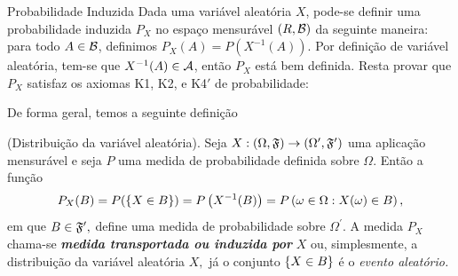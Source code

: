 \begin{frame}
%
\begin{block}{Probabilidade Induzida}
Dada uma variável aleatória $X$, pode-se definir uma probabilidade
induzida $P_X$ no espaço mensurável $(R,{\cal B})$ da seguinte maneira:
para todo $A\in {\cal B}$, definimos $P_X(A)=P(X^{-1}(A))$. Por definição
de variável aleatória, tem-se que $X^{-1}(A)\in {\cal A}$, então $P_X$
está bem definida. Resta provar que $P_X$ satisfaz os axiomas K1,
K2, e K4$'$ de probabilidade:
\end{block}

De forma geral, temos a seguinte definição

 \begin{defi}{(Distribuição da variável aleatória).} Seja $X:(\Omega ,\frak{F})\rightarrow (\Omega ^{\prime },\frak{F}^{\prime })$
	uma aplicação mensurável e seja $P$ uma medida de probabilidade definida sobre
	$\Omega .$ Então a função $$P_{X}(B)=P(\{{X \in B}\})=P\left( X^{-1}(B)\right) =
	P\left(\omega\in\Omega: X(\omega)\in B\right),$$ em que $B\in \frak{F}^{\prime },$ define
	uma medida de probabilidade sobre $\Omega ^{\prime }.$  A medida $P_{X}$ chama-se \textit{\bf medida transportada ou induzida por }$X$ ou, simplesmente, a distribuição da
	variável aleatória $X,$ já o conjunto  $\{{X \in B}\}$ é o {\it evento aleatório.}
\end{defi}


\end{frame}

